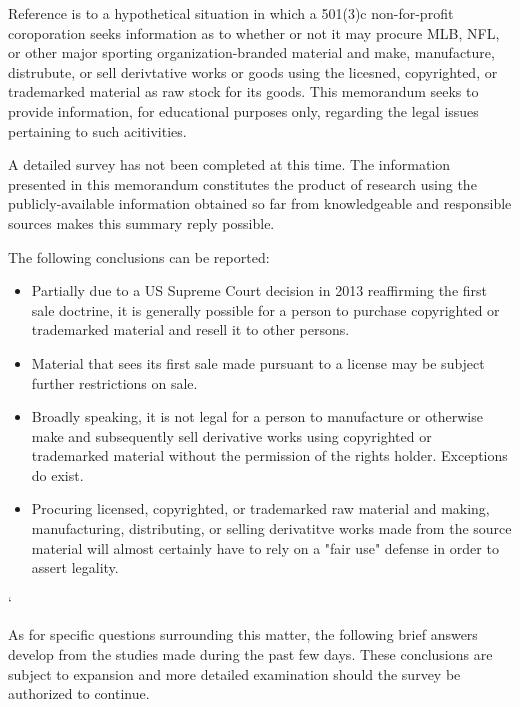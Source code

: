 \documentclass[letterpaper,11pt]{texMemo}
\begin{document}
\maketitle


  Reference is to a hypothetical situation in which a 501(3)c non-for-profit coroporation seeks information as to whether or not it may procure MLB, NFL, or other major sporting organization-branded material and make, manufacture, distrubute, or sell derivtative works or goods using the licesned, copyrighted, or trademarked material as raw stock for its goods. This memorandum seeks to provide information, for educational purposes only, regarding the legal issues pertaining to such acitivities.

  A detailed survey has not been completed at this time. The information presented in this memorandum constitutes the product of research using the publicly-available information obtained so far from knowledgeable and responsible sources makes this summary reply possible.

  The following conclusions can be reported:

  \begin{itemize}
   \item Partially due to a US Supreme Court decision in 2013 reaffirming the first sale doctrine, it is generally possible for a person to purchase copyrighted or trademarked material and resell it to other persons.
   \item Material that sees its first sale made pursuant to a license may be subject further restrictions on sale.
   \item Broadly speaking, it is not legal for a person to manufacture or otherwise make and subsequently sell derivative works using copyrighted or trademarked material without the permission of the rights holder. Exceptions do exist.
   \item Procuring licensed, copyrighted, or trademarked raw material and making, manufacturing, distributing, or selling derivatitve works made from the source material will almost certainly have to rely on a "fair use" defense in order to assert legality.
  \end{itemize}`

  As for specific questions surrounding this matter, the following brief answers develop from the studies made during the past few days. These conclusions are subject to expansion and more detailed examination should the survey be authorized to continue.
\end{document}
